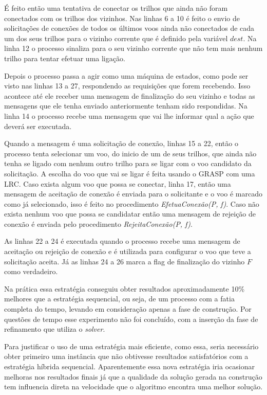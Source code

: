 É feito então uma tentativa de conectar os trilhos que ainda não
foram conectados com os trilhos dos vizinhos. Nas linhas 6 a 10 é
feito o envio de solicitações de conexões de todos os últimos voos ainda não
conectados de cada um dos seus trilhos para o vizinho corrente que é definido
pela variável $dest$. Na linha 12 o processo sinaliza para o seu vizinho
corrente que não tem mais nenhum trilho para tentar efetuar uma ligação.

Depois o processo passa a agir como uma máquina de estados, como pode ser visto
nas linhas 13 a 27, respondendo as requisições que forem recebendo. Isso
acontece até ele receber uma mensagem de finalização do seu vizinho e todas as mensagens
que ele tenha enviado anteriormente tenham sido respondidas. Na linha 14
o processo recebe uma mensagem que vai lhe informar qual a ação que deverá
ser executada.

Quando a mensagem é uma solicitação de conexão, linhas 15 a 22, então o processo
tenta selecionar um voo, do inicio de um de seus trilhos, que ainda não tenha se
ligado com nenhum outro trilho para se ligar com o voo candidato da solicitação.
A escolha do voo que vai se ligar é feita usando o GRASP com uma LRC. Caso
exista algum voo que possa se conectar, linha 17, então uma mensagem de
aceitação de conexão é enviada para o solicitante e o voo é marcado como já
selecionado, isso é feito no procedimento \textit{EfetuaConexão(P, f)}. Caso
não exista nenhum voo que possa se candidatar então uma mensagem de rejeição de
conexão é enviada pelo procedimento \textit{RejeitaConexão(P, f)}.

As linhas 22 a 24 é executada quando o processo recebe uma mensagem de aceitação
ou rejeição de conexão e é utilizada para configurar o voo que teve a
solicitação aceita. Já as linhas 24 a 26 marca a flag de finalização do vizinho
$F$ como verdadeiro.

Na prática essa estratégia conseguiu obter resultados aproximadamente 10\%
melhores que a estratégia sequencial, ou seja, de um processo com a fatia
completa do tempo, levando em consideração apenas a fase de construção. Por
questões de tempo esse experimento não foi concluído, com a inserção da fase de
refinamento que utiliza o \textit{solver}.

Para justificar o uso de uma estratégia mais eficiente, como essa, seria
necessário obter primeiro uma instância que não obtivesse resultados
satisfatórios com a estratégia híbrida sequencial. Aparentemente essa nova
estratégia iria ocasionar melhoras nos resultados finais já que a qualidade da
solução gerada na construção tem influencia direta na velocidade que o
algoritmo encontra uma melhor solução.




 
 
